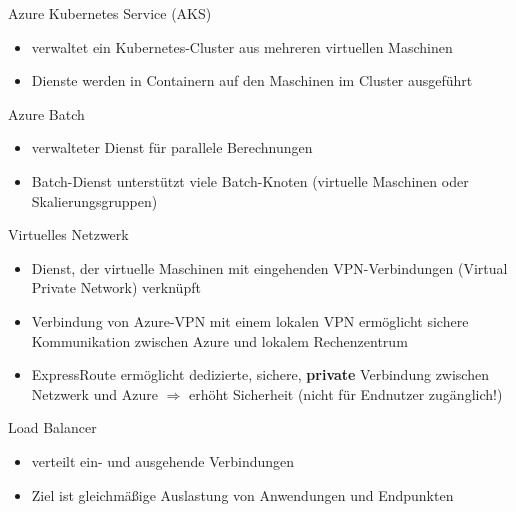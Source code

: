 \begin{flashcard}[Definition]{Azure Kubernetes Service (AKS)}
    \begin{itemize}
        \item verwaltet ein Kubernetes-Cluster aus mehreren virtuellen Maschinen
        \item Dienste werden in Containern auf den Maschinen im Cluster ausgeführt
    \end{itemize}

\end{flashcard}

\begin{flashcard}[Definition]{Azure Batch}
    \begin{itemize}
        \item verwalteter Dienst für parallele Berechnungen
        \item Batch-Dienst unterstützt viele Batch-Knoten (virtuelle Maschinen oder Skalierungsgruppen)
    \end{itemize}
\end{flashcard}

\begin{flashcard}[Definition]{Virtuelles Netzwerk}
    \begin{itemize}
        \item Dienst, der virtuelle Maschinen mit eingehenden VPN-Verbindungen (Virtual Private Network) verknüpft
        \item Verbindung von Azure-VPN mit einem lokalen VPN ermöglicht sichere Kommunikation zwischen Azure und lokalem Rechenzentrum
        \item ExpressRoute ermöglicht dedizierte, sichere, \textbf{private} Verbindung zwischen Netzwerk und Azure\newline
        $\Rightarrow$ erhöht Sicherheit (nicht für Endnutzer zugänglich!)
    \end{itemize}

\end{flashcard}

\begin{flashcard}[Definition]{Load Balancer}
    \begin{itemize}
        \item verteilt ein- und ausgehende Verbindungen
        \item Ziel ist gleichmäßige Auslastung von Anwendungen und Endpunkten
    \end{itemize}

\end{flashcard}

